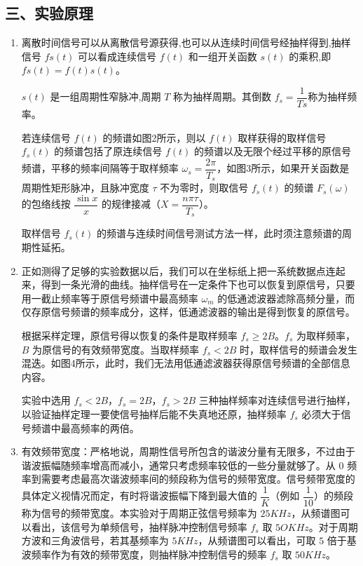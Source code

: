 \documentclass[dvipsnames, svgnames,a4paper,11pt]{article}
\begin{document}
\subsection*{三、实验原理}
\begin{enumerate}
  \item 离散时间信号可以从离散信号源获得,也可以从连续时间信号经抽样得到,抽样信号 $fs(t)$ 可以看成连续信号 $f(t)$ 和一组开关函数 $s(t)$ 的乘积,即 $fs(t)= f(t) s(t)$。
  
  $s(t)$ 是一组周期性窄脉冲,周期 $T$ 称为抽样周期。其倒数 $f_s = \dfrac{1}{Ts}$称为抽样频率。
  
  若连续信号 $f(t)$ 的频谱如图2所示，则以 $f(t)$ 取样获得的取样信号 $f_s(t)$ 的频谱包括了原连续信号 $f(t)$ 的频谱以及无限个经过平移的原信号频谱，平移的频率间隔等于取样频率 $\omega_s = \dfrac{2\pi}{T_s}$，如图3所示，如果开关函数是周期性矩形脉冲，且脉冲宽度 $\tau$ 不为零时，则取信号 $f_s(t)$ 的频谱 $F_s(\omega)$ 的包络线按 $\dfrac{\sin x}{x}$ 的规律接减（$X = \dfrac{n\pi \tau}{T_s}$）。
  
  取样信号 $f_s(t)$ 的频谱与连续时间信号测试方法一样，此时须注意频谱的周期性延拓。
  
  \item 正如测得了足够的实验数据以后，我们可以在坐标纸上把一系统数据点连起来，得到一条光滑的曲线。抽样信号在一定条件下也可以恢复到原信号，只要用一截止频率等于原信号频谱中最高频率 $\omega_m$ 的低通滤波器滤除高频分量，而仅存原信号频谱的频率成分，这样，低通滤波器的输出是得到恢复的原信号。
  
  根据采样定理，原信号得以恢复的条件是取样频率 $f_s \ge 2B$。$f_s$ 为取样频率，$B$ 为原信号的有效频带宽度。当取样频率 $f_s < 2B$ 时，取样信号的频谱会发生混迭。如图4所示，此时，我们无法用低通滤波器获得原信号频谱的全部信息内容。
  
  实验中选用 $f_s<2B$，$f_s=2B$，$f_s > 2B$ 三种抽样频率对连续信号进行抽样，以验证抽样定理一要使信号抽样后能不失真地还原，抽样频率 $f_s$ 必须大于信号频谱中最高频率的两倍。

  \item 有效频带宽度：严格地说，周期性信号所包含的谐波分量有无限多，不过由于谐波振幅随频率增高而减小，通常只考虑频率较低的一些分量就够了。从 $0$ 频率到需要考虑最高次谐波频率间的频段称为信号的频带宽度。信号频带宽度的具体定义视情况而定，有时将谐波振幅下降到最大值的 $\dfrac{1}{K}$（例如 $\dfrac{1}{10}$）的频段称为信号的频带宽度。本实验对于周期正弦信号频率为 $25KHz$，从频谱图可以看出，该信号为单频信号，抽样脉冲控制信号频率 $f_s$ 取 $5OKHz$。对于周期方波和三角波信号，若其基频率为 $5KHz$，从频谱图可以看出，可取 $5$ 倍于基波频率作为有效的频带宽度，则抽样脉冲控制信号的频率 $f_s$ 取 $50KHz$。
  
\end{enumerate}
\end{document}
